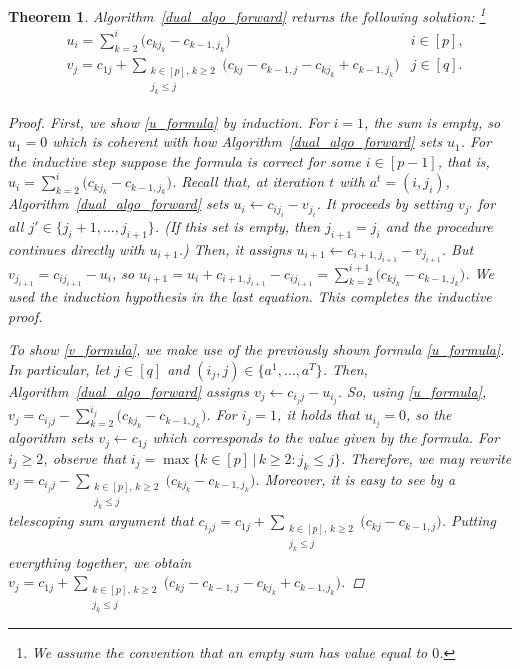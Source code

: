 \documentclass[10pt,a4paper]{amsart}
\newtheorem{theorem}{Theorem}[section]
\begin{document}
\setcounter{theorem}{4}
\setcounter{equation}{3}
\begin{theorem}\label{theorem_u_v_formulas}
    Algorithm~\ref{dual_algo_forward} returns the following solution: \footnote{We assume the convention that an empty sum has value equal to $0$.}
    \begin{align}
        &u_i = \sum_{k=2}^{i} \bigl( c_{k j_k} - c_{k-1, j_k} \bigr) &i \in [p], \label{u_formula} \\
        &v_j = c_{1j} + \sum_{\substack{k \in [p], \, k \geq 2 \\ j_k \leq j}} \bigl( c_{kj} - c_{k-1, j} - c_{k j_k} + c_{k-1, j_k} \bigr) &j \in [q]. \label{v_formula}
    \end{align}

    \begin{proof}
        First, we show \eqref{u_formula} by induction. For $i = 1$, the sum is empty, so $u_1 = 0$ which is coherent with how Algorithm~\ref{dual_algo_forward} sets $u_1$. For the inductive step suppose the formula is correct for some $i \in [p-1]$, that is, $u_i = \sum_{k=2}^{i} \bigl( c_{k j_k} - c_{k-1, j_k} \bigr)$. Recall that, at iteration $t$ with $a^t = (i, j_i)$, Algorithm~\ref{dual_algo_forward} sets $u_{i} \gets c_{i j_i} - v_{j_i}$. It proceeds by setting $v_{j'}$ for all $j' \in \{j_i+1, \dots, j_{i+1}\}$. (If this set is empty, then $j_{i+1} = j_i$ and the procedure continues directly with $u_{i+1}$.) Then, it assigns $u_{i+1} \gets c_{i+1, j_{i+1}} - v_{j_{i+1}}$. But $v_{j_{i+1}} = c_{i j_{i+1}} - u_i$, so $u_{i+1} = u_i + c_{i+1, j_{i+1}} - c_{i j_{i+1}} = \sum_{k = 2}^{i+1} \bigl( c_{k j_k} - c_{k-1, j_k} \bigr)$. We used the induction hypothesis in the last equation. This completes the inductive proof.

        To show \eqref{v_formula}, we make use of the previously shown formula \eqref{u_formula}. In particular, let $j \in [q]$ and $(i_j,j) \in \{a^1, \dots, a^T\}$. Then, Algorithm~\ref{dual_algo_forward} assigns $v_j \gets c_{i_j j} - u_{i_j}$. So, using \eqref{u_formula}, $v_j = c_{i_j j} - \sum_{k=2}^{i_j} \bigl( c_{k j_k} - c_{k-1, j_k} \bigr)$. For $i_j = 1$, it holds that $u_{i_j} = 0$, so the algorithm sets $v_j \gets c_{1j}$ which corresponds to the value given by the formula. For $i_j \geq 2$, observe that $i_j = \max \{k \in [p] \, | \, k \geq 2: j_k \leq j\}$. Therefore, we may rewrite $v_j = c_{i_j j} - \sum_{\substack{k \in [p], \, k \geq 2 \\ j_k \leq j}} \bigl( c_{k j_k} - c_{k-1, j_k} \bigr)$. Moreover, it is easy to see by a telescoping sum argument that $c_{i_j j} = c_{1j} + \sum_{\substack{k \in [p], \, k \geq 2 \\ j_k \leq j}} \bigl( c_{k j} - c_{k-1, j} \bigr)$. Putting everything together, we obtain $v_j = c_{1j} + \sum_{\substack{k \in [p], \, k \geq 2 \\ j_k \leq j}} \bigl( c_{kj} - c_{k-1, j} - c_{k j_k} + c_{k-1, j_k} \bigr)$.
    \end{proof}

\end{theorem}
\end{document}
